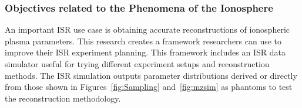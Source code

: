 %

\subsubsection{Objectives related to the Phenomena of the Ionosphere}
An important ISR use case is obtaining accurate reconstructions of ionospheric plasma parameters. This research creates a framework researchers can use to improve their ISR experiment planning. This framework includes an ISR data simulator useful for trying different experiment setups and reconstruction methods. The ISR simulation outputs parameter distributions derived or directly from those shown in Figures~\ref{fig:Sampling} and~\ref{fig:mzsim} as phantoms to test the reconstruction methodology.

